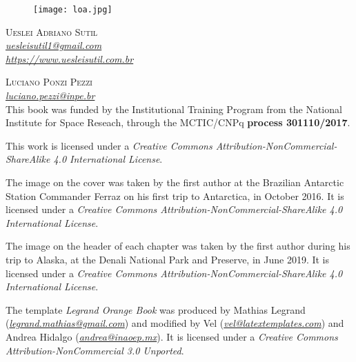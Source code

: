 \newpage
\thispagestyle{empty}

\begin{figure}[H]
    \centering
    \vspace*{\fill}
    \texttt{[image: loa.jpg]}
    \vspace{1cm}
\end{figure}


\noindent \textsc{Ueslei Adriano Sutil} 
\\
\noindent \textcolor{bleu_cite}{\href{uesleisutil1@gmail.com}{\textit{uesleisutil1@gmail.com}}}
\\  %
\noindent \textcolor{bleu_cite}{\href{https://www.uesleisutil.com.br}{\textit{https://www.uesleisutil.com.br}}}
\bigskip

\noindent \textsc{Luciano Ponzi Pezzi}
\\
\noindent \textcolor{bleu_cite}{\href{luciano.pezzi@inpe.br}{\textit{luciano.pezzi@inpe.br}}}  %
\bigskip
\\

\noindent This book was funded by the Institutional Training Program from the National Institute for Space Reseach, through the MCTIC/CNPq \textbf{process 301110/2017}.
\bigskip

\noindent This work is licensed under a \textit{Creative Commons Attribution-NonCommercial-ShareAlike 4.0 International License}.
\bigskip

\noindent The image on the cover was taken by the first author at the Brazilian Antarctic Station Commander Ferraz on his first trip to Antarctica,
          in October 2016. It is licensed under a \textit{Creative Commons Attribution-NonCommercial-ShareAlike 4.0 International License}. 
\bigskip

\noindent The image on the header of each chapter was taken by the first author during his trip to Alaska, at the Denali National Park and Preserve, in June 2019. 
          It is licensed under a \textit{Creative Commons Attribution-NonCommercial-ShareAlike 4.0 International License}. 
\bigskip

\noindent The template \textit{Legrand Orange Book} was produced by Mathias Legrand (\textcolor{bleu_cite}{\href{legrand.mathias@gmail.com}{\textit{legrand.mathias@gmail.com}}}) 
          and modified by Vel (\textcolor{bleu_cite}{\href{vel@latextemplates.com}{\textit{vel@latextemplates.com}}}) and Andrea Hidalgo (\textcolor{bleu_cite}{\href{andrea@inaoep.mx}{\textit{andrea@inaoep.mx}}}). 
          It is licensed under a \textit{Creative Commons Attribution-NonCommercial 3.0 Unported}.
\bigskip

